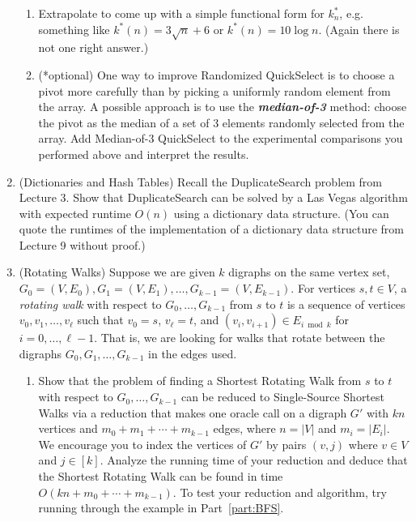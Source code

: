 \documentclass[11pt]{article}
\begin{document}
\begin{enumerate}
\begin{enumerate}
        \item Extrapolate to come up with a simple functional form for $k^*_n$, e.g. something like $k^*(n)=3\sqrt{n}+6$ or $k^*(n)=10\log n$. (Again there is not one right answer.)

        \item (*optional)  One way to improve Randomized QuickSelect is to choose a pivot more carefully than by picking a uniformly random element from the array. A possible approach is to use the \textit{\textbf{median-of-3}} method: choose the pivot as the median of a set of 3 elements randomly selected from the array. Add Median-of-3 QuickSelect to the experimental comparisons you performed above and interpret the results.
    \end{enumerate}


    \item (Dictionaries and Hash Tables) 
    Recall the DuplicateSearch problem from Lecture 3. Show that DuplicateSearch can be solved by a Las Vegas algorithm with expected runtime $O(n)$ using a dictionary data structure.  (You can quote the runtimes of the implementation of a dictionary data structure from Lecture 9 without proof.) 

    \item  (Rotating Walks)  
    Suppose we are given $k$ digraphs on the same vertex set, $G_0=(V,E_0), G_1=(V,E_1), \ldots, G_{k-1}=(V,E_{k-1})$.  For vertices $s,t\in V$, a {\em rotating walk} with respect to $G_0,\ldots,G_{k-1}$ from $s$ to $t$ is a sequence of vertices $v_0,v_1,\ldots,v_{\ell}$ such that $v_0=s$, $v_\ell=t$, and $(v_i,v_{i+1})\in E_{i \bmod k}$ for $i=0,\ldots,\ell-1$.  That is, we are looking for walks that rotate between the digraphs $G_0,G_1,\ldots,G_{k-1}$ in the edges used.
    \begin{enumerate}
        \item Show that the problem of finding a Shortest Rotating Walk from $s$ to $t$ with respect to $G_0,\ldots,G_{k-1}$ 
        can be reduced to Single-Source Shortest Walks via a reduction that makes one oracle call on 
        a digraph $G'$ with $kn$ vertices and $m_0+m_1+\cdots+m_{k-1}$ edges, where $n=|V|$ and $m_i=|E_i|$.
        We encourage you to index the vertices of $G'$ by pairs $(v,j)$ where $v\in V$ and $j\in [k]$. 
        Analyze the running time of your reduction and deduce that the Shortest Rotating Walk can be found in time $O(kn+m_0+\cdots+m_{k-1})$.
        \label{part:ReduceToOrdinary}  To test your reduction and algorithm, try running through the example in Part~\ref{part:BFS}.
        

\end{enumerate}
\end{enumerate}
\end{document}
